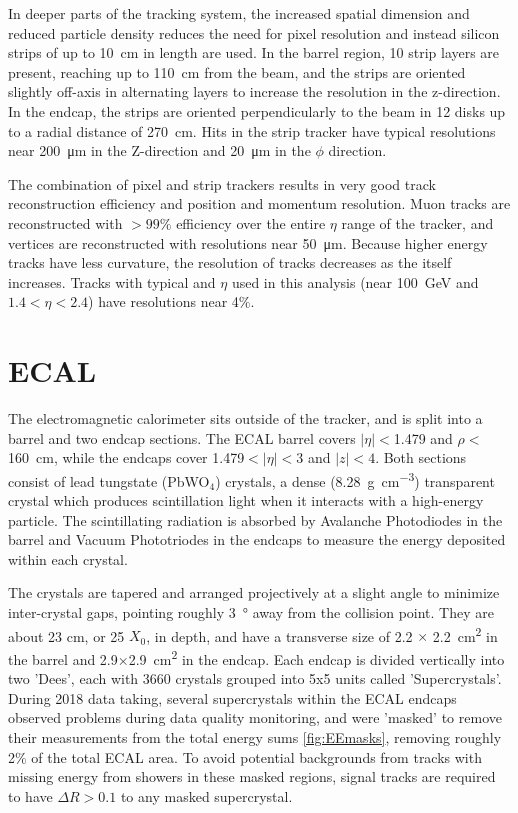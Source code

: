 In deeper parts of the tracking system, the increased spatial dimension and reduced particle density reduces the need for pixel resolution and instead silicon strips of up to \SI{10}{\centi\meter} in length are used. 
In the barrel region, 10 strip layers are present, reaching up to \SI{110}{\centi\meter} from the beam, and the strips are oriented slightly off-axis in alternating layers to increase the resolution in the z-direction. 
In the endcap, the strips are oriented perpendicularly to the beam in 12 disks up to a radial distance of \SI{270}{\centi\meter}.
Hits in the strip tracker have typical resolutions near \SI{200}{\micro\meter} in the Z-direction and \SI{20}{\micro\meter} in the $\phi$ direction.

The combination of pixel and strip trackers results in very good track reconstruction efficiency and position and momentum resolution.
Muon tracks are reconstructed with $>99\%$ efficiency over the entire $\eta$ range of the tracker, and vertices are reconstructed with resolutions near \SI{50}{\micro\meter}.
Because higher energy tracks have less curvature, the \pt resolution of tracks decreases as the \pt itself increases. Tracks with typical \pt and $\eta$ used in this analysis (\pt near \SI{100}{\giga\eV} and $1.4<\eta<2.4$) have resolutions near 4$\%$. 

\section{ECAL}
The electromagnetic calorimeter sits outside of the tracker, and is split into a barrel and two endcap sections. 
The ECAL barrel covers $\lvert\eta\rvert<$1.479 and $\rho<$\SI{160}{\centi\meter}, while the endcaps cover 1.479$<\lvert\eta\rvert<$3 and $\lvert z \rvert <4$. 
Both sections consist of lead tungstate (PbWO$_4$) crystals, a dense (\SI{8.28}{\gram\per\cubic\centi\meter}) transparent crystal which produces scintillation light when it interacts with a high-energy particle. 
The scintillating radiation is absorbed by Avalanche Photodiodes in the barrel and Vacuum Phototriodes in the endcaps to measure the energy deposited within each 
crystal. 

The crystals are tapered and arranged projectively at a slight angle to minimize inter-crystal gaps, pointing roughly \SI{3}{\degree} away from the collision point. 
They are about 23 cm, or 25 $X_0$, in depth, and have a transverse size of 2.2 $\times$ \SI{2.2}{\centi\meter^2} in the barrel and 2.9$\times$\SI{2.9}{\centi\meter^2} in the endcap. 
Each endcap is divided vertically into two 'Dees', each with 3660 crystals grouped into 5x5 units called 'Supercrystals'. 
During 2018 data taking, several supercrystals within the ECAL endcaps observed problems during data quality monitoring, and were 'masked' to remove their measurements from the total energy sums \cref{fig:EEmasks}, removing roughly 2$\%$ of the total ECAL area.
To avoid potential backgrounds from tracks with missing energy from showers in these masked regions, signal tracks are required to have $\Delta R>0.1$ to any masked supercrystal.

